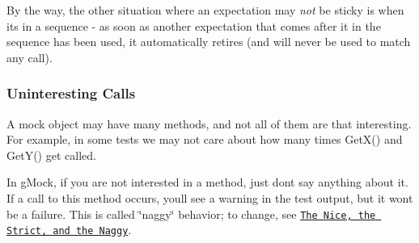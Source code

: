 By the way, the other situation where an expectation may {\itshape not} be sticky is when it\textquotesingle{}s in a sequence -\/ as soon as another expectation that comes after it in the sequence has been used, it automatically retires (and will never be used to match any call).

\subsubsection*{Uninteresting Calls}

A mock object may have many methods, and not all of them are that interesting. For example, in some tests we may not care about how many times {\ttfamily Get\+X()} and {\ttfamily Get\+Y()} get called.

In g\+Mock, if you are not interested in a method, just don\textquotesingle{}t say anything about it. If a call to this method occurs, you\textquotesingle{}ll see a warning in the test output, but it won\textquotesingle{}t be a failure. This is called \char`\"{}naggy\char`\"{} behavior; to change, see \href{gmock_cook_book.md#NiceStrictNaggy}{\tt The Nice, the Strict, and the Naggy}. 